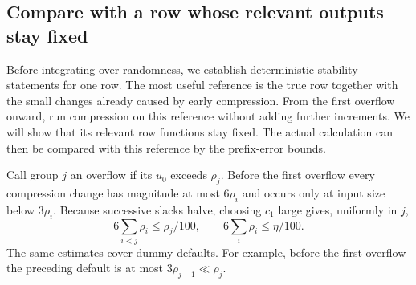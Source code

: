 \subsection{Compare with a row whose relevant outputs stay fixed}

Before integrating over randomness, we establish deterministic stability statements for one row. The most useful reference is the true row together with the small changes already caused by early compression. From the first overflow onward, run compression on this reference without adding further increments. We will show that its relevant row functions stay fixed. The actual calculation can then be compared with this reference by the prefix-error bounds.

Call group $j$ an overflow if its $u_0$ exceeds $\rho_j$.  Before the first
overflow every compression change has magnitude at most $6\rho_i$ and
occurs only at input size below $3\rho_i$.  Because successive slacks
halve, choosing $c_1$ large gives, uniformly in $j$,
\begin{equation}
 6\sum_{i<j}\rho_i\leq\rho_j/100,
 \qquad 6\sum_i\rho_i\leq\eta/100.
 \label{eq:buf-small-floors}
\end{equation}
The same estimates cover dummy defaults.  For example, before the first
overflow the preceding default is at most $3\rho_{j-1}\ll\rho_j$.

